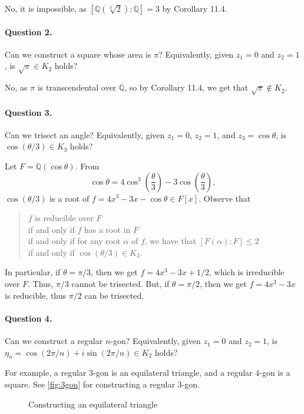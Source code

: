 \documentclass[twoside]{article}
\newcommand\Q{\mathbb Q}
\theoremstyle{remark}
\begin{document}
No, it is impossible, as \([\Q(\sqrt[3]2) : \Q] = 3\) by Corollary 11.4.

\paragraph{Question 2.} Can we construct a square whose area is \(\pi\)? Equivalently, given \(z_1 = 0\) and \(z_2 = 1\), is \(\sqrt\pi \in K_2\) holds?

No, as \(\pi\) is transcendental over \(\Q\), so by Corollary 11.4, we get that \(\sqrt\pi \notin K_2\).

\paragraph{Question 3.} Can we trisect an angle? Equivalently, given \(z_1 = 0\), \(z_2 = 1\), and \(z_3 = \cos\theta\), is \(\cos(\theta/3) \in K_3\) holds?

Let \(F = \Q(\cos\theta)\). From
\[ \cos\theta = 4 \cos^3 \left(\frac\theta3\right) - 3 \cos \left(\frac\theta3\right), \]
\(\cos(\theta/3)\) is a root of \(f = 4x^3 - 3x - \cos\theta \in F[x]\). Observe that
\begin{quote}
  \(f\) is reducible over \(F\) \\
  if and only if \(f\) has a root in \(F\) \\
  if and only if for any root \(\alpha\) of \(f\), we have that \([F(\alpha):F] \leq 2\) \\
  if and only if \(\cos(\theta/3) \in K_3\).
\end{quote}

In particular, if \(\theta=\pi/3\), then we get \(f = 4x^3 - 3x + 1/2\), which is irreducible over \(F\). Thus, \(\pi/3\) cannot be trisected. But, if \(\theta = \pi/2\), then we get \(f = 4x^3 - 3x\) is reducible, thus \(\pi/2\) can be trisected.

\paragraph{Question 4.} Can we construct a regular \(n\)-gon? Equivalently, given \(z_1=0\) and \(z_2=1\), is \(\eta_n = \cos(2\pi/n) + i \sin(2\pi/n) \in K_2\) holds?

For example, a regular \(3\)-gon is an equilateral triangle, and a regular \(4\)-gon is a square. See \autoref{fig:3gon} for constructing a regular \(3\)-gon.
\begin{figure}[ht]
  \centering
  \caption{Constructing an equilateral triangle}\label{fig:3gon}
\end{figure}
\end{document}
